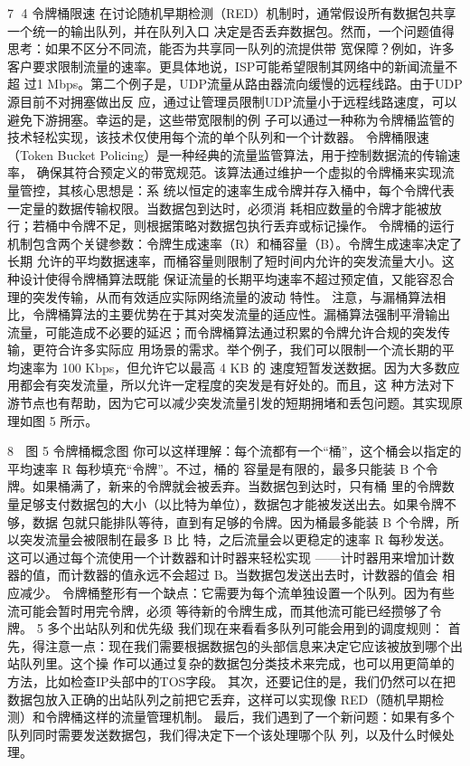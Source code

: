                                                                      7
4 令牌桶限速
  在讨论随机早期检测（RED）机制时，通常假设所有数据包共享一个统一的输出队列，并在队列入口
决定是否丢弃数据包。然而，一个问题值得思考：如果不区分不同流，能否为共享同一队列的流提供带
宽保障？例如，许多客户要求限制流量的速率。更具体地说，ISP可能希望限制其网络中的新闻流量不超
过1 Mbps。第二个例子是，UDP流量从路由器流向缓慢的远程线路。由于UDP源目前不对拥塞做出反
应，通过让管理员限制UDP流量小于远程线路速度，可以避免下游拥塞。幸运的是，这些带宽限制的例
子可以通过一种称为令牌桶监管的技术轻松实现，该技术仅使用每个流的单个队列和一个计数器。
  令牌桶限速（Token Bucket Policing）是一种经典的流量监管算法，用于控制数据流的传输速率，
确保其符合预定义的带宽规范。该算法通过维护一个虚拟的令牌桶来实现流量管控，其核心思想是：系
统以恒定的速率生成令牌并存入桶中，每个令牌代表一定量的数据传输权限。当数据包到达时，必须消
耗相应数量的令牌才能被放行；若桶中令牌不足，则根据策略对数据包执行丢弃或标记操作。
  令牌桶的运行机制包含两个关键参数：令牌生成速率（R）和桶容量（B）。令牌生成速率决定了长期
允许的平均数据速率，而桶容量则限制了短时间内允许的突发流量大小。这种设计使得令牌桶算法既能
保证流量的长期平均速率不超过预定值，又能容忍合理的突发传输，从而有效适应实际网络流量的波动
特性。
   注意，与漏桶算法相比，令牌桶算法的主要优势在于其对突发流量的适应性。漏桶算法强制平滑输出
流量，可能造成不必要的延迟；而令牌桶算法通过积累的令牌允许合规的突发传输，更符合许多实际应
用场景的需求。举个例子，我们可以限制一个流长期的平均速率为 100 Kbps，但允许它以最高 4 KB 的
速度短暂发送数据。因为大多数应用都会有突发流量，所以允许一定程度的突发是有好处的。而且，这
种方法对下游节点也有帮助，因为它可以减少突发流量引发的短期拥堵和丢包问题。其实现原理如图 5
所示。




                                                       8
                   图 5 令牌桶概念图
 你可以这样理解：每个流都有一个“桶”，这个桶会以指定的平均速率 R 每秒填充“令牌”。不过，桶的
容量是有限的，最多只能装 B 个令牌。如果桶满了，新来的令牌就会被丢弃。当数据包到达时，只有桶
里的令牌数量足够支付数据包的大小（以比特为单位），数据包才能被发送出去。如果令牌不够，数据
包就只能排队等待，直到有足够的令牌。因为桶最多能装 B 个令牌，所以突发流量会被限制在最多 B 比
特，之后流量会以更稳定的速率 R 每秒发送。这可以通过每个流使用一个计数器和计时器来轻松实现
——计时器用来增加计数器的值，而计数器的值永远不会超过 B。当数据包发送出去时，计数器的值会
相应减少。
 令牌桶整形有一个缺点：它需要为每个流单独设置一个队列。因为有些流可能会暂时用完令牌，必须
等待新的令牌生成，而其他流可能已经攒够了令牌。
5 多个出站队列和优先级
我们现在来看看多队列可能会用到的调度规则：
首先，得注意一点：现在我们需要根据数据包的头部信息来决定它应该被放到哪个出站队列里。这个操
作可以通过复杂的数据包分类技术来完成，也可以用更简单的方法，比如检查IP头部中的TOS字段。
其次，还要记住的是，我们仍然可以在把数据包放入正确的出站队列之前把它丢弃，这样可以实现像
RED（随机早期检测）和令牌桶这样的流量管理机制。
最后，我们遇到了一个新问题：如果有多个队列同时需要发送数据包，我们得决定下一个该处理哪个队
列，以及什么时候处理。

